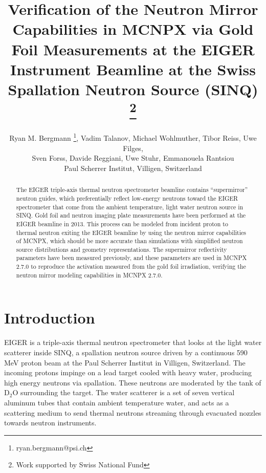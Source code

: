 \documentclass[a4paper,
              ]{jacow}
\begin{document}
\title{Verification of the Neutron Mirror Capabilities in MCNPX via Gold Foil Measurements at the EIGER Instrument Beamline at the Swiss Spallation Neutron Source (SINQ) \thanks{Work supported by Swiss National Fund}}

\author{Ryan M. Bergmann \thanks{ryan.bergmann@psi.ch}, Vadim Talanov, Michael Wohlmuther, Tibor Reiss, Uwe Filges, \\ Sven Forss, Davide Reggiani, Uwe Stuhr, Emmanouela Rantsiou\\ Paul Scherrer Institut, Villigen, Switzerland\\}

\maketitle

%
\begin{abstract}
   The EIGER triple-axis thermal neutron spectrometer beamline contains “supermirror” neutron guides, which preferentially reflect low-energy neutrons toward the EIGER spectrometer that come from the ambient temperature, light water neutron source in SINQ.  Gold foil and neutron imaging plate measurements have been performed at the EIGER beamline in 2013.  This process can be modeled from incident proton to thermal neutron exiting the EIGER beamline by using the neutron mirror capabilities of MCNPX, which should be more accurate than simulations with simplified neutron source distributions and geometry representations.  The supermirror reflectivity parameters have been measured previously, and these parameters are used in MCNPX 2.7.0 to reproduce the activation measured from the gold foil irradiation, verifying the neutron mirror modeling capabilities in MCNPX 2.7.0.
\end{abstract}


\section{Introduction}

EIGER is a triple-axis thermal neutron spectrometer that looks at the light water scatterer inside SINQ, a spallation neutron source driven by a continuous 590 MeV proton beam at the Paul Scherrer Institut in Villigen, Switzerland.  The incoming protons impinge on a lead target cooled with heavy water, producing high energy neutrons via spallation.  These neutrons are moderated by the tank of D$_2$O surrounding the target.  The water scatterer is a set of seven vertical aluminum tubes that contain ambient temperature water, and acts as a scattering medium to send thermal neutrons streaming through evacuated nozzles towards neutron instruments.  
\end{document}
